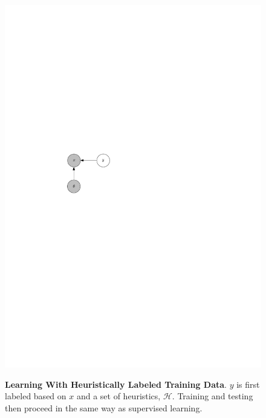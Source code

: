 \documentclass[12pt]{article}
\begin{document}
\begin{figure}
{    \includegraphics{heuristic_test.pdf}
  }
  \caption{{\bf Learning With Heuristically Labeled Training Data}.  $y$ is first labeled based on $x$ and a set of heuristics, $\mathcal{H}$.  Training
  and testing then proceed in the same way as supervised learning.}
  \label{heuristic}
\end{figure}
\end{document}

